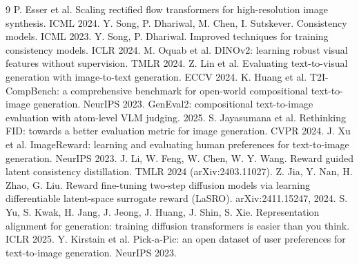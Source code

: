 \documentclass[11pt,a4paper]{article}
\begin{document}
\begin{thebibliography}{9}
 P. Esser et al. Scaling rectified flow transformers for high-resolution image synthesis. ICML 2024.
 Y. Song, P. Dhariwal, M. Chen, I. Sutskever. Consistency models. ICML 2023.
 Y. Song, P. Dhariwal. Improved techniques for training consistency models. ICLR 2024.
 M. Oquab et al. DINOv2: learning robust visual features without supervision. TMLR 2024.
 Z. Lin et al. Evaluating text-to-visual generation with image-to-text generation. ECCV 2024.
 K. Huang et al. T2I-CompBench: a comprehensive benchmark for open-world compositional text-to-image generation. NeurIPS 2023.
 GenEval2: compositional text-to-image evaluation with atom-level VLM judging. 2025.
 S. Jayasumana et al. Rethinking FID: towards a better evaluation metric for image generation. CVPR 2024.
 J. Xu et al. ImageReward: learning and evaluating human preferences for text-to-image generation. NeurIPS 2023.
 J. Li, W. Feng, W. Chen, W. Y. Wang. Reward guided latent consistency distillation. TMLR 2024 (arXiv:2403.11027).
 Z. Jia, Y. Nan, H. Zhao, G. Liu. Reward fine-tuning two-step diffusion models via learning differentiable latent-space surrogate reward (LaSRO). arXiv:2411.15247, 2024.
 S. Yu, S. Kwak, H. Jang, J. Jeong, J. Huang, J. Shin, S. Xie. Representation alignment for generation: training diffusion transformers is easier than you think. ICLR 2025.
 Y. Kirstain et al. Pick-a-Pic: an open dataset of user preferences for text-to-image generation. NeurIPS 2023.
\end{thebibliography}
\end{document}
